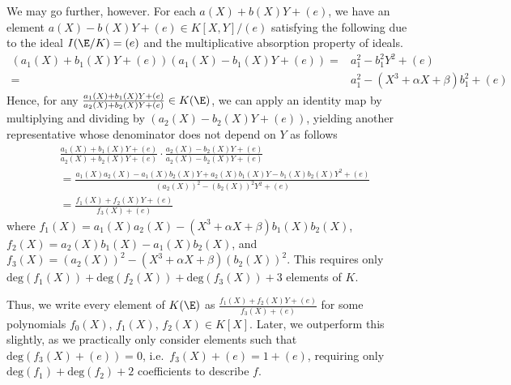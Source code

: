 \documentclass[11pt,letterpaper]{article}
\newcommand{\polys}{K[X,Y]}
\theoremstyle{definition}
\newcommand{\6}{\mathbf}
\newcommand{\7}{\mathcal}
\begin{document}
We may go further, however. For each $a(X) + b(X)Y + (e)$, we have an element $a(X) - b(X)Y + (e) \in \polys/(e)$ satisfying the following due to the ideal $I(\E/K) = (e)$ and the multiplicative absorption property of ideals.
\begin{align*}
(a_1(X) + b_1(X)Y + (e))(a_1(X) - b_1(X)Y + (e)) =& a_1^2 - b_1^2Y^2 + (e) \\
=& a_1^2 - (X^3 + \alpha X + \beta)b_1^2 + (e)
\end{align*}
Hence, for any $\frac{a_1(X)+b_1(X)Y + (e)}{a_2(X)+b_2(X)Y + (e)} \in K(\E)$, we can apply an identity map by multiplying and dividing by $(a_2(X) - b_2(X)Y + (e))$, yielding another representative whose denominator does not depend on $Y$ as follows
\begin{align*}
& \frac{a_1(X)+b_1(X)Y + (e)}{a_2(X)+b_2(X)Y + (e)} \cdot \frac{a_2(X)-b_2(X)Y + (e)}{a_2(X)-b_2(X)Y + (e)} \\ &= \frac{a_1(X)a_2(X) - a_1(X) b_2(X) Y + a_2(X)b_1(X) Y - b_1(X) b_2(X) Y^2 + (e)}{(a_2(X))^2 - (b_2(X))^2Y^2 + (e)} \\
&= \frac{f_1(X) + f_2(X)Y + (e)}{f_3(X) + (e)}
\end{align*} where $f_1(X) = a_1(X) a_2(X) - (X^3 + \alpha X + \beta)b_1(X)b_2(X)$, $f_2(X) = a_2(X)b_1(X) - a_1(X) b_2(X)$, and $f_3(X) = (a_2(X))^2 - (X^3 + \alpha X + \beta)(b_2(X))^2$. This requires only $\text{deg}(f_1(X))+\text{deg}(f_2(X))+\text{deg}(f_3(X))+3$ elements of $K$.

Thus, we write every element of $K(\E)$ as $\frac{f_1(X) + f_2(X)Y + (e)}{f_3(X) + (e)}$ for some polynomials $f_0(X)$, $f_1(X)$, $f_2(X) \in K[X]$.
Later, we outperform this slightly, as we practically only consider elements such that $\text{deg}(f_3(X) + (e)) = 0$, i.e.\ $f_3(X) + (e) = 1 + (e)$, requiring only $\text{deg}(f_1)+\text{deg}(f_2)+2$ coefficients to describe $f$.
\end{document}
